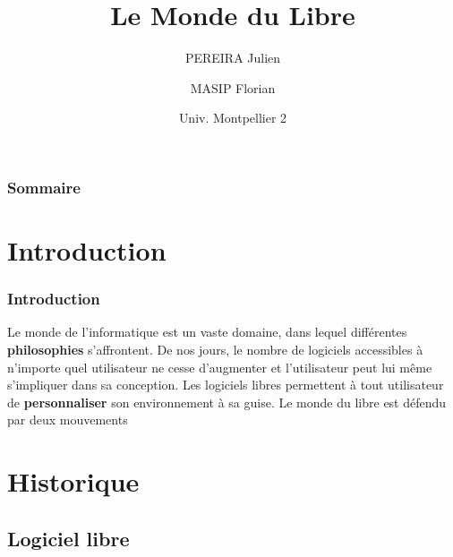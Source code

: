 \documentclass{beamer}
\institute{UM2}
\date{Univ. Montpellier 2}
\title{Le Monde du Libre}
\author{PEREIRA Julien \and MASIP Florian}
\begin{document}
\begin{frame}
	\titlepage
\end{frame}

\begin{frame}
	\frametitle{Sommaire}
	\tableofcontents[hideothersubsections]
\end{frame}

\section{Introduction}

\begin{frame}
	\frametitle{Introduction}
	Le monde de l'informatique est un vaste domaine, dans lequel différentes \textbf{philosophies} s'affrontent.
	\newline \newline
	De nos jours, le nombre de logiciels accessibles à n'importe quel utilisateur ne cesse d'augmenter et l'utilisateur peut lui même s'impliquer dans sa conception.
	\newline\newline 
	Les logiciels libres permettent à tout utilisateur de \textbf{personnaliser} son environnement à sa guise.
	\newline\newline
	Le monde du libre est défendu par deux mouvements 
\end{frame}

\section{Historique}
\subsection[Logiciel libre]{Logiciel libre}
\end{document}
